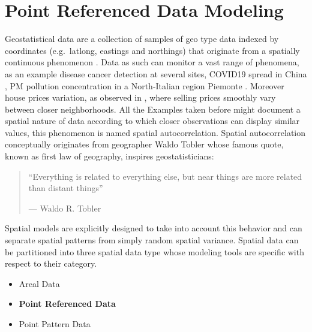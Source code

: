\documentclass[
  12pt,
  a4paper,
  oneside]{book}
\providecommand{\tightlist}{%
  \setlength{\itemsep}{0pt}\setlength{\parskip}{0pt}}
\begin{document}
\hypertarget{prdm}{%
\chapter{Point Referenced Data Modeling}\label{prdm}}

Geostatistical data are a collection of samples of geo type data indexed by coordinates (e.g.~latlong, eastings and northings) that originate from a spatially continuous phenomenon \citep{Moraga2019}. Data as such can monitor a vast range of phenomena, as an example disease cancer detection \citep{Bell2006} at several sites, COVID19 spread in China \citep{Li_Li_Ding_Hu_Chen_Wang_Peng_Shen_2020}, PM pollution concentration in a North-Italian region Piemonte \citep{Cameletti2012}. Moreover house prices variation, as observed in \citet{Bayesian_INLA_Rubio}, where selling prices smoothly vary between closer neighborhoods. All the Examples taken before might document a spatial nature of data according to which closer observations can display similar values, this phenomenon is named spatial autocorrelation. Spatial autocorrelation conceptually originates from geographer Waldo Tobler whose famous quote, known as first law of geography, inspires geostatisticians:

\begin{quote}
``Everything is related to everything else,
but near things are more related than distant things''

\hfill --- Waldo R. Tobler
\end{quote}

Spatial models are explicitly designed to take into account this behavior and can separate spatial patterns from simply random spatial variance.
Spatial data can be partitioned into three spatial data type whose modeling tools are specific with respect to their category.

\begin{itemize}
\tightlist
\item
  Areal Data
\item
  \textbf{Point Referenced Data}
\item
  Point Pattern Data
\end{itemize}
\end{document}
